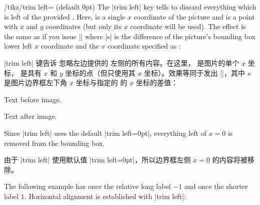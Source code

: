 \begin{key}{/tikz/trim left= (default 0pt)}
    The |trim left| key tells \pgfname\space to discard everything which is
    left of the provided . Here, 
    is a single $x$ coordinate of the picture and  is a point
    with $x$ and $y$ coordinates (but only its $x$ coordinate will be used).
    The effect is the same as if you issue |\hspace{-s}| where |s| is the
    difference of the picture's bounding box lower left $x$ coordinate and the
    $x$ coordinate specified as :
    
    |trim left| 键告诉 \pgfname 忽略左边提供的  左侧的所有内容。在这里， 是图片的单个 $x$ 坐标， 是具有 $x$ 和 $y$ 坐标的点（但只使用其 $x$ 坐标）。效果等同于发出 |\hspace{-s}|，其中 $s$ 是图片边界框左下角 $x$ 坐标与指定的  的 $x$ 坐标的差值：

\begin{codeexample}[]
Text before image.%
Text after image.
\end{codeexample}
    Since |trim left| uses the default |trim left=0pt|, everything left of
    $x=0$ is removed from the bounding box.

    由于 |trim left| 使用默认值 |trim left=0pt|，所以边界框左侧 $x=0$ 的内容将被移除。

    The following example has once the relative long label $-1$ and once the
    shorter label $1$. Horizontal alignment is established with |trim left|:


\end{key}
